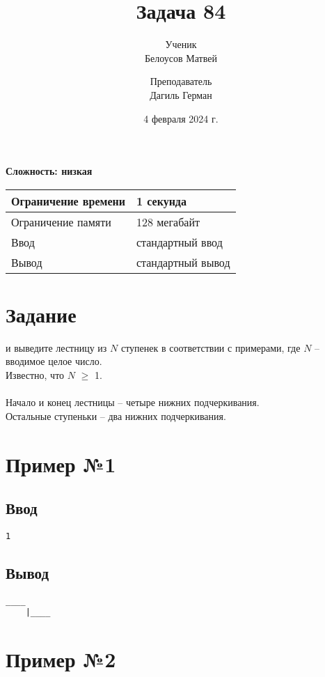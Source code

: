 \documentclass{article}
\title{Задача 84}
\author{
\small{Ученик}\\
Белоусов Матвей\\
  \texttt{}
  \and
\small{Преподаватель}\\
  Дагиль Герман\\
  \texttt{\href{https://t.me/QuanTutor}{\color{black}{tg: @QuanTutor}}}
}
\date{4 февраля 2024 г.}
\begin{document}
\maketitle
\noindent
\begin{flushright}
\textbf{Сложность: \textcolor{easy_diff}{низкая}}
\end{flushright}
\begin{tabular}{ | m{10em} | m{10em}| } 
  \hline
  Ограничение времени & 1 секунда \\ 
  \hline
  Ограничение памяти & 128 мегабайт \\ 
  \hline
  Ввод &стандартный ввод \\ 
  \hline
  Вывод & стандартный вывод \\ 
  \hline
\end{tabular}
\section*{Задание}
 и выведите лестницу из $N$ ступенек в соответствии с примерами, где $N$ -- вводимое целое число.\\
Известно, что $N$ $\geq$ 1.\\\\
Начало и конец лестницы -- четыре нижних подчеркивания.\\
Остальные ступеньки -- два нижних подчеркивания.
\section*{Пример №1}

\subsection*{Ввод}
\begin{blackbox}
\begin{lstlisting}[style=consolestyle]
1
\end{lstlisting}
\end{blackbox}

\subsection*{Вывод}
\begin{blackbox}
\begin{lstlisting}[style=consolestyle]
____
    |____
\end{lstlisting}
\end{blackbox}

\section*{Пример №2}
\end{document}
